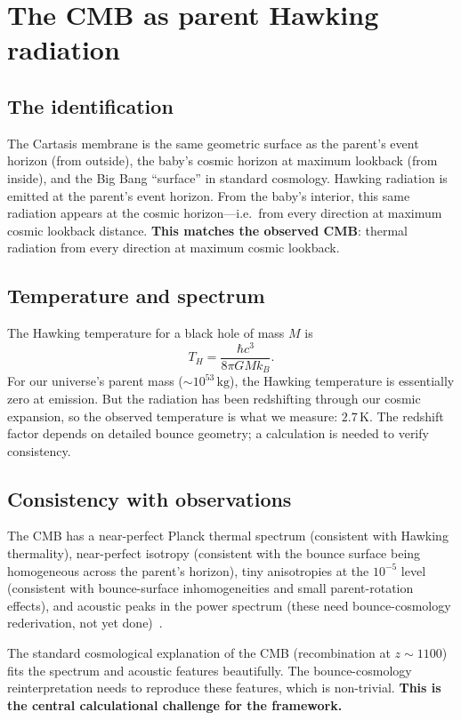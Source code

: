 \section{The CMB as parent Hawking radiation}
\label{sec:cmb-hawking}

\subsection{The identification}

The Cartasis membrane is the same geometric surface as the parent's event
horizon (from outside), the baby's cosmic horizon at maximum lookback (from
inside), and the Big Bang ``surface'' in standard cosmology. Hawking radiation
is emitted at the parent's event horizon. From the baby's interior, this same
radiation appears at the cosmic horizon---i.e.\ from every direction at maximum
cosmic lookback distance. \textbf{This matches the observed CMB}: thermal
radiation from every direction at maximum cosmic lookback.

\subsection{Temperature and spectrum}

The Hawking temperature for a black hole of mass $M$ is
\[
  T_H = \frac{\hbar c^3}{8\pi G M k_B}.
\]
For our universe's parent mass ($\sim 10^{53}\,\mathrm{kg}$), the Hawking
temperature is essentially zero at emission. But the radiation has been
redshifting through our cosmic expansion, so the observed temperature is what we
measure: $2.7\,\mathrm{K}$. The redshift factor depends on detailed bounce
geometry; a calculation is needed to verify consistency.

\subsection{Consistency with observations}

The CMB has a near-perfect Planck thermal spectrum (consistent with Hawking
thermality), near-perfect isotropy (consistent with the bounce surface being
homogeneous across the parent's horizon), tiny anisotropies at the $10^{-5}$
level (consistent with bounce-surface inhomogeneities and small parent-rotation
effects), and acoustic peaks in the power spectrum (these need bounce-cosmology
rederivation, not yet done)~\citep{planck2018}.

The standard cosmological explanation of the CMB (recombination at $z \sim 1100$)
fits the spectrum and acoustic features beautifully. The bounce-cosmology
reinterpretation needs to reproduce these features, which is non-trivial.
\textbf{This is the central calculational challenge for the \SCT framework.}

